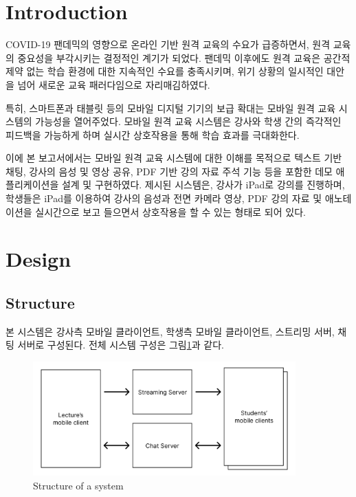 \documentclass[pdflatex,sn-mathphys-num]{sn-jnl}%
\theoremstyle{thmstyleone}%
\theoremstyle{thmstyletwo}%
\theoremstyle{thmstylethree}%
\begin{document}

\maketitle

\section{Introduction}\label{sec1}

COVID-19 팬데믹의 영향으로 온라인 기반 원격 교육의 수요가 급증하면서, 원격 교육의 중요성을 부각시키는 결정적인 계기가 되었다. 팬데믹 이후에도 원격 교육은 공간적 제약 없는 학습 환경에 대한 지속적인 수요를 충족시키며, 위기 상황의 일시적인 대안을 넘어 새로운 교육 패러다임으로 자리매김하였다.

특히, 스마트폰과 태블릿 등의 모바일 디지털 기기의 보급 확대는 모바일 원격 교육 시스템의 가능성을 열어주었다. 모바일 원격 교육 시스템은 강사와 학생 간의 즉각적인 피드백을 가능하게 하며 실시간 상호작용을 통해 학습 효과를 극대화한다.

이에 본 보고서에서는 모바일 원격 교육 시스템에 대한 이해를 목적으로 텍스트 기반 채팅, 강사의 음성 및 영상 공유, PDF 기반 강의 자료 주석 기능 등을 포함한 데모 애플리케이션을 설계 및 구현하였다. 제시된 시스템은, 강사가 iPad로 강의를 진행하며, 학생들은 iPad를 이용하여 강사의 음성과 전면 카메라 영상, PDF 강의 자료 및 애노테이션을 실시간으로 보고 들으면서 상호작용을 할 수 있는 형태로 되어 있다.

\section{Design}\label{sec2}

\subsection{Structure}\label{subsec1}

본 시스템은 강사측 모바일 클라이언트, 학생측 모바일 클라이언트, 스트리밍 서버, 채팅 서버로 구성된다. 전체 시스템 구성은 그림\ref{fig1}과 같다.

\begin{figure}[h]
\centering
\includegraphics[width=0.9\textwidth]{architecture_of_system.png}
\caption{Structure of a system}\label{fig1}
\end{figure}
\end{document}
